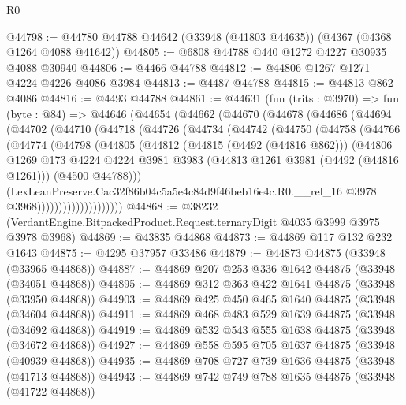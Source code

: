 \begin{lexlean}{R0}
\begin{coremodule}
@44798 := @44780 @44788 @44642 (@33948 (@41803 @44635)) (@4367 (@4368 @1264 @4088 @41642))
@44805 := @6808 @44788 @440 @1272 @4227 @30935 @4088 @30940
@44806 := @4466 @44788
@44812 := @44806 @1267 @1271 @4224 @4226 @4086 @3984
@44813 := @4487 @44788
@44815 := @44813 @862 @4086
@44816 := @4493 @44788
@44861 := @44631
    (fun (trits : @3970) =>
    fun (byte : @84) =>
    @44646
      (@44654
        (@44662
          (@44670
            (@44678
              (@44686
                (@44694
                  (@44702
                    (@44710
                      (@44718
                        (@44726
                          (@44734
                            (@44742
                              (@44750
                                (@44758
                                  (@44766
                                    (@44774
                                      (@44798
                                        (@44805
                                          (@44812
                                            (@44815 (@4492 (@44816 @862)))
                                            (@44806
                                              @1269
                                              @173
                                              @4224
                                              @4224
                                              @3981
                                              @3983
                                              (@44813 @1261 @3981 (@4492 (@44816 @1261)))
                                              (@4500 @44788)))
                                          (LexLeanPreserve.Cac32f86b04c5a5e4c84d9f46beb16e4c.R0.__rel_16
                                            @3978
                                            @3968))))))))))))))))))))
@44868 := @38232 (VerdantEngine.BitpackedProduct.Request.ternaryDigit @4035 @3999 @3975 @3978 @3968)
@44869 := @43835 @44868
@44873 := @44869 @117 @132 @232 @1643
@44875 := @4295 @37957 @33486
@44879 := @44873 @44875 (@33948 (@33965 @44868))
@44887 := @44869 @207 @253 @336 @1642 @44875 (@33948 (@34051 @44868))
@44895 := @44869 @312 @363 @422 @1641 @44875 (@33948 (@33950 @44868))
@44903 := @44869 @425 @450 @465 @1640 @44875 (@33948 (@34604 @44868))
@44911 := @44869 @468 @483 @529 @1639 @44875 (@33948 (@34692 @44868))
@44919 := @44869 @532 @543 @555 @1638 @44875 (@33948 (@34672 @44868))
@44927 := @44869 @558 @595 @705 @1637 @44875 (@33948 (@40939 @44868))
@44935 := @44869 @708 @727 @739 @1636 @44875 (@33948 (@41713 @44868))
@44943 := @44869 @742 @749 @788 @1635 @44875 (@33948 (@41722 @44868))

\end{coremodule}
\end{lexlean}
